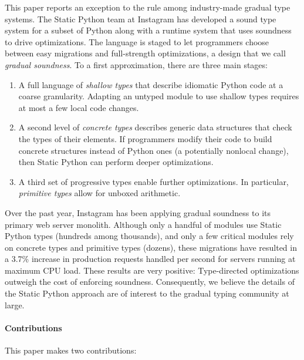 \documentclass[english,cleveref,crc]{programming}
\newcommand{\SP}{Static Python}
\newcommand{\CPUchange}{3.7\%}
\begin{document}
This paper reports an exception to the rule among industry-made gradual type systems.
The \SP{} team at Instagram has developed a sound type system for a subset of
Python along with a runtime system that uses soundness to drive optimizations.
The language is staged to let programmers choose between easy migrations and
full-strength optimizations, a design that we call \emph{gradual soundness}.
To a first approximation, there are three main stages:
\begin{enumerate}
  \item
    A full language of \emph{shallow types\/} that describe idiomatic
    Python code at a coarse granularity.
    Adapting an untyped module to use shallow types requires at most a few local code
    changes.
  \item
    A second level of \emph{concrete types\/} describes generic data structures
    that check the types of their elements.
    If programmers modify their code to build concrete structures instead of Python
    ones (a potentially nonlocal change), then \SP{} can perform deeper optimizations.
  \item
    A third set of progressive types enable further optimizations.
    In particular, \emph{primitive types\/} allow for unboxed arithmetic.
\end{enumerate}

Over the past year, Instagram has been applying gradual soundness to its
primary web server monolith.
Although only a handful of modules use \SP{} types (hundreds among thousands),
and only a few critical modules rely on concrete types and primitive types (dozens),
these migrations have resulted in a \CPUchange{} increase in production requests handled
per second for servers running at maximum CPU load.
These results are very positive:
Type-directed optimizations outweigh the cost of enforcing soundness.
Consequently, we believe the details of the \SP{} approach are of interest to
the gradual typing community at large.


\paragraph*{Contributions}
This paper makes two contributions:
\end{document}
